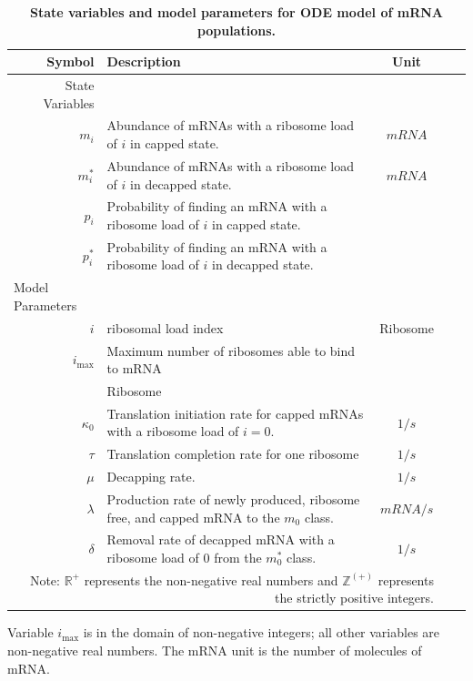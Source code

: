 \documentclass[10pt,letterpaper]{article}
\newcommand{\imax}{\ensuremath{{i_{\max}}}\xspace}
\begin{document}
\begin{table}[!ht]
\begin{adjustwidth}{-2.25in}{0in} 
\centering
\caption{{\bf State variables and model parameters for ODE model of mRNA populations.}}
\begin{tabular}{|rp{4in}|c|c|c|}
\hline
\textbf{Symbol}&\textbf{Description}&\textbf{Unit} \\\hline
State Variables & &  \\ 
\hline
$m_i$ & Abundance of mRNAs with a ribosome load of $i$ in capped state. & $mRNA$ \\
$m_i^*$ & Abundance of mRNAs with a ribosome load of $i$ in decapped state. & $mRNA$ \\ \hline
$p_i$ & Probability of finding an mRNA with a ribosome load of $i$ in capped state. & \\
$p_i^*$ & Probability of finding an mRNA with a ribosome load of $i$ in decapped state. &  \\ \hline
\multicolumn{1}{l}{Model Parameters} \\ \hline
$i$ & ribosomal load index & Ribosome\\
 \imax & Maximum number of ribosomes able to bind to mRNA\\ & Ribosome \\
$\kappa_0$ & Translation initiation rate for capped mRNAs with a ribosome load of $i=0$. & $1/s$\\
$\tau$ & Translation completion rate for one ribosome & $1/s$\\
$\mu $ & Decapping rate. & $1/s$\\
$\lambda$ & Production rate of newly produced, ribosome free, and capped mRNA to the $m_0$ class. & $mRNA/s$\\
$\delta$ & Removal rate of decapped mRNA with a ribosome load of 0 from the $m_0^*$ class. & $1/s$\\ \hline 
\multicolumn{3}{|p{450pt}|}{\footnotesize Note: $\mathbb{R}^+$ represents the non-negative real numbers and $\mathbb{Z}^{(+)}$ represents the strictly positive integers.} \\ \hline
\end{tabular}
\begin{flushleft}
Variable \imax is in the domain of non-negative integers; all other variables are non-negative real numbers.
The mRNA unit is the number of molecules of mRNA.
\end{flushleft}
\label{tab:params}
\end{adjustwidth}
\end{table}
\end{document}
